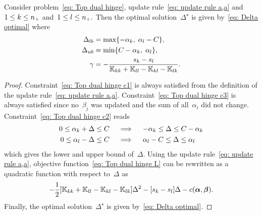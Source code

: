 \begin{lemma}
  Consider problem~\eqref{eq: Top dual hinge}, update rule~\eqref{eq: update rule a,a} and~$1 \leq k \leq n_{+}$ and~$1 \leq l \leq n_{+}.$ Then the optimal solution~$\Delta^{\star}$ is given by~\eqref{eq: Delta optimal} where
  \begin{align*}
    \Delta_{lb} & = \max\{- \alpha_k,\; \alpha_l - C\}, \\
    \Delta_{ub} & = \min\{C - \alpha_k,\; \alpha_l \}, \\
    \gamma & = -\frac{s_k - s_l}{\mathbb{K}_{kk} + \mathbb{K}_{ll} - \mathbb{K}_{kl} - \mathbb{K}_{lk}}.
  \end{align*}
\end{lemma}

\begin{proof}
  Constraint~\eqref{eq: Top dual hinge c1} is always satisfied from the definition of the update rule~\eqref{eq: update rule a,a}. Constraint~\eqref{eq: Top dual hinge c3} is always satisfied since no~$\beta_j$ was updated and the sum of all~$\alpha_i$ did not change. Constraint~\eqref{eq: Top dual hinge c2} reads
  \begin{align*}
    0 \leq \alpha_k + \Delta \leq C
    & \quad \implies \quad
    - \alpha_k \leq \Delta \leq C - \alpha_k \\
    0 \leq \alpha_l - \Delta \leq C
    & \quad \implies \quad
    \alpha_l - C \leq \Delta \leq \alpha_l
  \end{align*}
  which gives the lower and upper bound of~$\Delta.$ Using the update rule~\eqref{eq: update rule a,a}, objective function~\eqref{eq: Top dual hinge L} can be rewritten as a quadratic function with respect to~$\Delta$ as
  \begin{equation*}
    - \frac{1}{2} \Brac[s]{\K_{kk} + \K_{ll} - \K_{kl} - \K_{lk}} \Delta^2
    - \Brac[s]{s_k - s_l} \Delta
    - c(\bm{\alpha}, \bm{\beta}).
  \end{equation*}
  Finally, the optimal solution~$\Delta^{\star}$ is given by~\eqref{eq: Delta optimal}.
\end{proof}

